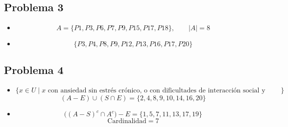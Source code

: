 \documentclass[12pt]{article}
\begin{document}
	\subsection*{Problema 3}
	\begin{itemize}
		\item[b)] 
		\[
		A=\{P1,P3,P6,P7,P9,P15,P17,P18\},\qquad |A|=8
		\]
		\item[c)]
		\[
		\{P3,P4,P8,P9,P12,P13,P16,P17,P20\}
		\]
	\end{itemize}
	
	\subsection*{Problema 4}
	\begin{itemize}
		\item[a)]
		\(\{x\in U \mid x \text{ con ansiedad sin estrés crónico, o con dificultades de interacción social y además con estrés crónico}\}\)
		\[
		(A-E)\cup(S\cap E)=\{2,4,8,9,10,14,16,20\}
		\]
		\item[b)]
		\[
		\big((A-S)^c\cap A^c\big)-E=\{1,5,7,11,13,17,19\}
		\]
		\[
		\text{Cardinalidad}=7
		\]
	\end{itemize}
	
\end{document}
